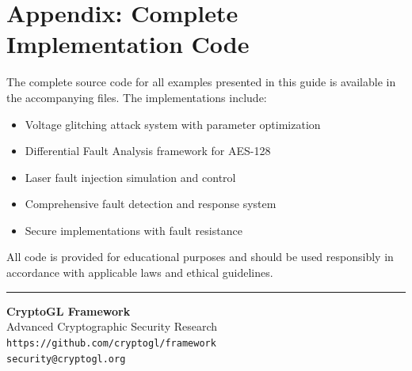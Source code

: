 \documentclass[12pt,a4paper]{article}
\begin{document}
\section{Appendix: Complete Implementation Code}

The complete source code for all examples presented in this guide is available in the accompanying files. The implementations include:

\begin{itemize}
    \item Voltage glitching attack system with parameter optimization
    \item Differential Fault Analysis framework for AES-128
    \item Laser fault injection simulation and control
    \item Comprehensive fault detection and response system
    \item Secure implementations with fault resistance
\end{itemize}

All code is provided for educational purposes and should be used responsibly in accordance with applicable laws and ethical guidelines.

\vspace{1cm}
\hrule
\vspace{0.5cm}
\begin{center}
\textbf{CryptoGL Framework}\\
Advanced Cryptographic Security Research\\
\texttt{https://github.com/cryptogl/framework}\\
\texttt{security@cryptogl.org}
\end{center}
\end{document}
